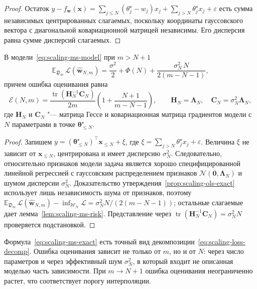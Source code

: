 \begin{proof}
    Остаток $y - f_{\mathbf w}(\mathbf x) = \sum_{j \leqslant N}(\theta_j^\star - w_j)x_j + \sum_{j > N}\theta_j^\star x_j + \varepsilon$ есть сумма независимых центрированных слагаемых, поскольку координаты гауссовского вектора с диагональной ковариационной матрицей независимы. Его дисперсия равна сумме дисперсий слагаемых.
\end{proof}

\begin{theorem}
    \label{thm:scaling-ms-exact}
    В модели~\eqref{eq:scaling-ms-model} при $m > N + 1$
    \begin{equation}
        \label{eq:scaling-ms-exact}
        \mathbb E_{\mathfrak D_m}\,\mathcal L(\hat{\mathbf w}_{N, m})
        =
        \frac{\sigma^2}{2}
        +
        \Phi(N)
        +
        \frac{\sigma_N^2\, N}{2(m - N - 1)},
    \end{equation}
    причем ошибка оценивания равна
    \[
        \mathcal E(N, m) = \frac{\operatorname{tr}(\mathbf H_N^{-1}\mathbf C_N)}{2m}\left(1 + \frac{N+1}{m-N-1}\right),
        \qquad
        \mathbf H_N = \boldsymbol\Lambda_N,
        \quad
        \mathbf C_N = \sigma_N^2 \boldsymbol\Lambda_N,
    \]
    где $\mathbf H_N$ и $\mathbf C_N$ "--- матрица Гессе и ковариационная матрица градиентов модели с $N$ параметрами в точке $\boldsymbol\theta^\star_{\leqslant N}$.
\end{theorem}

\begin{proof}
    Запишем $y = (\boldsymbol\theta^\star_{\leqslant N})^\top \mathbf x_{\leqslant N} + \xi$, где $\xi = \sum_{j>N}\theta_j^\star x_j + \varepsilon$. Величина $\xi$ не зависит от $\mathbf x_{\leqslant N}$, центрирована и имеет дисперсию $\sigma_N^2$. Следовательно, относительно признаков модели задача является хорошо специфицированной линейной регрессией с гауссовским распределением признаков $\mathcal N(\mathbf 0, \boldsymbol\Lambda_N)$ и шумом дисперсии $\sigma_N^2$. Доказательство утверждения~\ref{prop:scaling-ols-exact} использует лишь независимость шума от признаков, поэтому $\mathbb E_{\mathfrak D_m}\,\mathcal L(\hat{\mathbf w}_{N, m}) - \inf_{\mathcal W_N}\mathcal L = \sigma_N^2 N/(2(m - N - 1))$; остальные слагаемые дает лемма~\ref{lem:scaling-ms-risk}. Представление через $\operatorname{tr}(\mathbf H_N^{-1}\mathbf C_N) = \sigma_N^2 N$ проверяется подстановкой.
\end{proof}

Формула~\eqref{eq:scaling-ms-exact} есть точный вид декомпозиции~\eqref{eq:scaling-loss-decomp}. Ошибка оценивания зависит не только от $m$, но и от $N$: через число параметров и через эффективный шум $\sigma_N^2$, в который входит не описанная моделью часть зависимости. При $m \to N + 1$ ошибка оценивания неограниченно растет, что соответствует порогу интерполяции.

